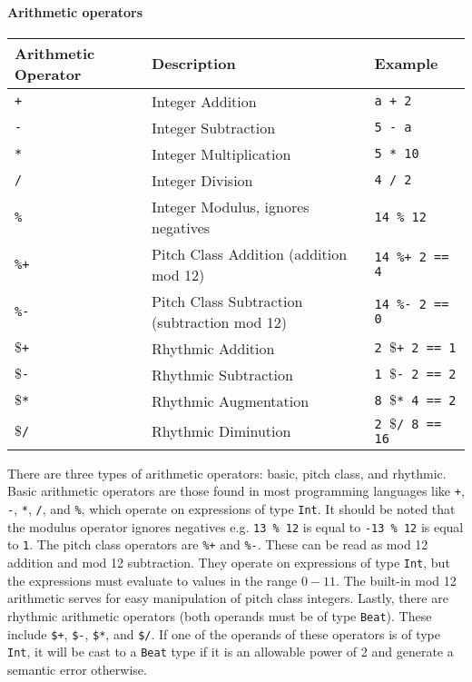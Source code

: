 \paragraph{Arithmetic operators}

\begin{table} [H]
\centering
\begin{tabularx}{\textwidth}{lXX}
\hline\hline
Arithmetic Operator & Description & Example \\
\hline\hline
  \texttt{+} & Integer Addition  & \texttt{a + 2} \\ \hline
  \texttt{-} & Integer Subtraction  & \texttt{5 - a} \\ \hline 
  \texttt{*} & Integer Multiplication  & \texttt{5 * 10} \\ \hline 
  \texttt{/} & Integer Division  & \texttt{4 / 2} \\ \hline 
  \texttt{\%} & Integer Modulus, ignores negatives  & \texttt{14 \% 12} \\ \hline
  \texttt{\%+} & Pitch Class Addition (addition mod 12)  & \texttt{14 \%+ 2 == 4 }\\ \hline
  \texttt{\%-} & Pitch Class Subtraction (subtraction mod 12)  & \texttt{14 \%- 2 == 0 } \\ \hline
  \texttt{$\$$+} & Rhythmic Addition & \texttt{2 $\$$+ 2 == 1} \\ \hline
  \texttt{$\$$-} & Rhythmic Subtraction & \texttt{1 $\$$- 2 == 2}  \\ \hline
  \texttt{$\$$*} & Rhythmic Augmentation & \texttt{8 $\$$* 4 == 2}  \\ \hline
  \texttt{$\$$/} & Rhythmic Diminution & \texttt{2 $\$$/ 8 == 16}  \\ \hline
\end{tabularx}
\end{table}

There are three types of arithmetic operators:
basic, pitch class, and rhythmic. 
Basic arithmetic operators are those found in most programming languages like 
\texttt{+}, \texttt{-}, \texttt{*}, \texttt{/}, and \texttt{\%}, which operate on expressions of
type \texttt{Int}. It should be noted that the modulus operator ignores negatives e.g.
\texttt{13 \% 12} is equal to \texttt{-13 \% 12} is equal to \texttt{1}.
The pitch class operators are \texttt{\%+} and \texttt{\%-}. These can be read as mod 12 addition
and mod 12 subtraction. They operate on expressions of type \texttt{Int}, but the expressions
must evaluate to values in the range $0-11$. The built-in mod 12
arithmetic serves for easy manipulation of pitch class integers.
Lastly, there are rhythmic arithmetic operators (both operands must be of type \texttt{Beat}). 
These include \texttt{\$+}, \texttt{\$-}, \texttt{\$*}, and \texttt{\$/}. If one of the operands
of these operators is of type \texttt{Int}, it will be cast to a \texttt{Beat} type if it is an
allowable power of 2 and generate a semantic error otherwise.

